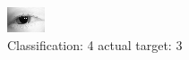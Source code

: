 \begin{figure}[h!]
\begin{center}
\includegraphics[width=0.60\columnwidth]{figures/ID65_class_4_target_3.png}
\end{center}
\caption{ Classification: 4 actual target: 3}
\label{fig:ID65_class_4_target_3}
\end{figure}
